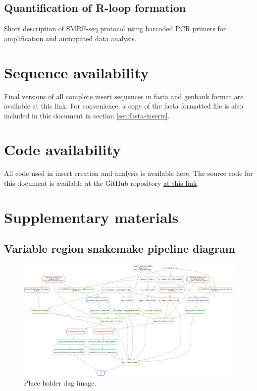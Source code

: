 \documentclass[11pt]{article}
\begin{document}
\subsection{Quantification of R-loop formation }

Short description of SMRF-seq protocol using barcoded PCR primers for amplification 
and anticipated data analysis. 

\section{Sequence availability}

Final versions of all complete insert sequences in fasta and genbank format are available at this link. For convenience, a copy of the fasta formatted file is also included in this document in section \ref{sec:fasta-inserts}. 


\section{Code availability}

All code used in insert creation and analysis is available here. The source code for this document is available at the GitHub repository \href{https://github.com/EthanHolleman/plasmid-VR-design}{at this link}.

\section{Supplementary materials}

\subsection{Variable region snakemake pipeline diagram}

\begin{figure}[H]
	\includegraphics[width=15cm]{images/misc/dag.png}
	\centering
	\caption{Place holder dag image.}
\end{figure}
\end{document}

